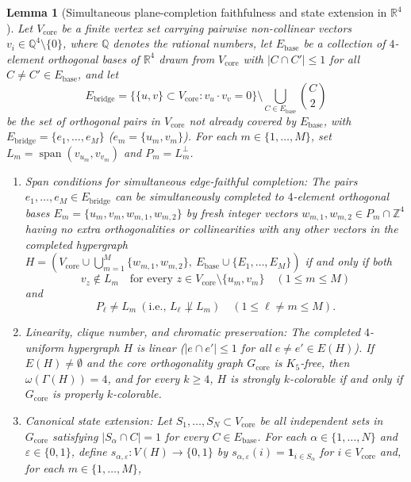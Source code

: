 \documentclass[
  aps,
  pra,
  reprint,
  superscriptaddress,
  amsmath,
  amssymb,
  nofootinbib,
  floatfix
]{revtex4-2}
\newtheorem{lemma}[theorem]{Lemma}
\theoremstyle{definition}
\theoremstyle{remark}
\newcommand{\R}{\mathbb{R}}
\newcommand{\Q}{\mathbb{Q}}
\DeclareMathOperator{\spanop}{span}
\begin{document}
\begin{lemma}[Simultaneous plane-completion faithfulness and state extension in $\R^4$]\label{lem:plane-completion}
Let $V_{\mathrm{core}}$ be a finite vertex set carrying pairwise non-collinear vectors $v_i\in\Q^4\setminus\{0\}$, where $\Q$ denotes the rational numbers, let $E_{\mathrm{base}}$ be a collection of $4$-element orthogonal bases of $\R^4$ drawn from $V_{\mathrm{core}}$ with $|C\cap C'|\le1$ for all $C\ne C'\in E_{\mathrm{base}}$, and let
\begin{equation}\label{eq:rem-edges}
E_{\mathrm{bridge}} = \bigl\{\{u,v\}\subset V_{\mathrm{core}} : v_u\cdot v_v=0\bigr\}\setminus \bigcup_{C\in E_{\mathrm{base}}}\binom{C}{2}
\end{equation}
be the set of orthogonal pairs in $V_{\mathrm{core}}$ not already covered by $E_{\mathrm{base}}$, with $E_{\mathrm{bridge}}=\{e_1,\ldots,e_M\}$ ($e_m=\{u_m,v_m\}$). For each $m\in\{1,\ldots,M\}$, set $L_m=\spanop(v_{u_m},v_{v_m})$ and $P_m=L_m^\perp$.
\begin{enumerate}
\item \emph{Span conditions for simultaneous edge-faithful completion:} The pairs $e_1,\ldots,e_M\in E_{\mathrm{bridge}}$ can be simultaneously completed to $4$-element orthogonal bases $E_m=\{u_m,v_m,w_{m,1},w_{m,2}\}$ by fresh integer vectors $w_{m,1},w_{m,2}\in P_m\cap\mathbb{Z}^4$ having \emph{no} extra orthogonalities or collinearities with any other vectors in the completed hypergraph $H=(V_{\mathrm{core}}\cup\bigcup_{m=1}^M\{w_{m,1},w_{m,2}\},\ E_{\mathrm{base}}\cup\{E_1,\ldots,E_M\})$ if and only if both
\begin{equation}\label{eq:span-condition}
v_z\notin L_m\quad\text{for every }z\in V_{\mathrm{core}}\setminus\{u_m,v_m\}
\quad(1\le m\le M)
\end{equation}
and
\begin{equation}\label{eq:plane-nonorth}
P_\ell\ne L_m\ (\text{i.e., }L_\ell\not\perp L_m)
\quad(1\le\ell\ne m\le M).
\end{equation}
\item \emph{Linearity, clique number, and chromatic preservation:} The completed $4$-uniform hypergraph $H$ is linear ($|e\cap e'|\le1$ for all $e\ne e'\in E(H)$). If $E(H)\ne\emptyset$ and the core orthogonality graph $G_{\mathrm{core}}$ is $K_5$-free, then $\omega(\Gamma(H))=4$, and for every $k\ge4$, $H$ is strongly $k$-colorable if and only if $G_{\mathrm{core}}$ is properly $k$-colorable.
\item \emph{Canonical state extension:} Let $S_1,\ldots,S_N\subset V_{\mathrm{core}}$ be all independent sets in $G_{\mathrm{core}}$ satisfying $|S_\alpha\cap C|=1$ for every $C\in E_{\mathrm{base}}$. For each $\alpha\in\{1,\ldots,N\}$ and $\varepsilon\in\{0,1\}$, define $s_{\alpha,\varepsilon}:V(H)\to\{0,1\}$ by $s_{\alpha,\varepsilon}(i)=\mathbf{1}_{i\in S_\alpha}$ for $i\in V_{\mathrm{core}}$ and, for each $m\in\{1,\ldots,M\}$,

\end{enumerate}
\end{lemma}
\end{document}

